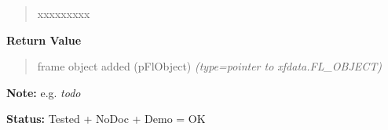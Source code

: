\begin{boxedminipage}{\funcwidth}
\begin{quote}
\begin{Ventry}{xxxxxxxxx}
        \end{Ventry}

      \end{quote}

      \textbf{Return Value}
    \vspace{-1ex}

      \begin{quote}

frame object added (pFlObject)
      {\it (type=pointer to xfdata.FL\_OBJECT)}

      \end{quote}

\textbf{Note:} 
e.g. \emph{todo}


\textbf{Status:} 
Tested + NoDoc + Demo = OK


    \end{boxedminipage}

    \label{xformslib:flmisc:fl_add_labelframe}

    \vspace{0.5ex}

